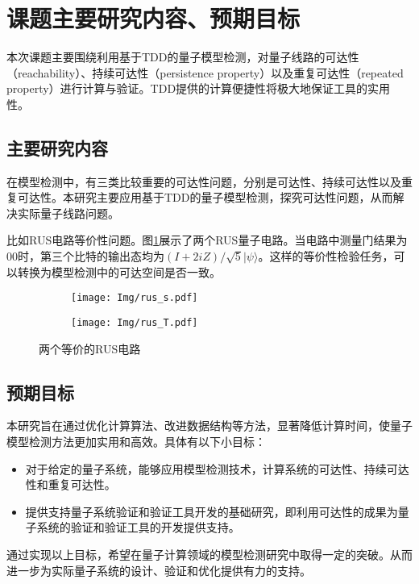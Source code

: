 \section{课题主要研究内容、预期目标}
本次课题主要围绕利用基于TDD的量子模型检测，对量子线路的可达性（reachability）、持续可达性（persistence property）以及重复可达性（repeated property）进行计算与验证。TDD提供的计算便捷性将极大地保证工具的实用性。
\subsection{主要研究内容}
在模型检测中，有三类比较重要的可达性问题，分别是可达性、持续可达性以及重复可达性。本研究主要应用基于TDD的量子模型检测，探究可达性问题，从而解决实际量子线路问题。

比如RUS电路等价性问题。图\ref{fig:rus-equal}展示了两个RUS量子电路。当电路中测量门结果为$00$时，第三个比特的输出态均为$\left(I+2iZ\right)/ \sqrt 5 |\psi\rangle$。这样的等价性检验任务，可以转换为模型检测中的可达空间是否一致。
\begin{figure}[!htbp]
	\centering
	\begin{subfigure}[b]{0.4\textwidth}
        \centering
        \texttt{[image: Img/rus\_s.pdf]}
	\end{subfigure}
	\qquad
	\begin{subfigure}[b]{0.4\textwidth}
        \centering
        \texttt{[image: Img/rus\_T.pdf]}
	\end{subfigure}
	\caption{两个等价的RUS电路\citep{Bocharov_2015}}
	\label{fig:rus-equal}
\end{figure}

\subsection{预期目标}
本研究旨在通过优化计算算法、改进数据结构等方法，显著降低计算时间，使量子模型检测方法更加实用和高效。具体有以下小目标：
\begin{itemize}
	\item 	对于给定的量子系统，能够应用模型检测技术，计算系统的可达性、持续可达性和重复可达性。
	\item 提供支持量子系统验证和验证工具开发的基础研究，即利用可达性的成果为量子系统的验证和验证工具的开发提供支持。
\end{itemize}
通过实现以上目标，希望在量子计算领域的模型检测研究中取得一定的突破。从而进一步为实际量子系统的设计、验证和优化提供有力的支持。
